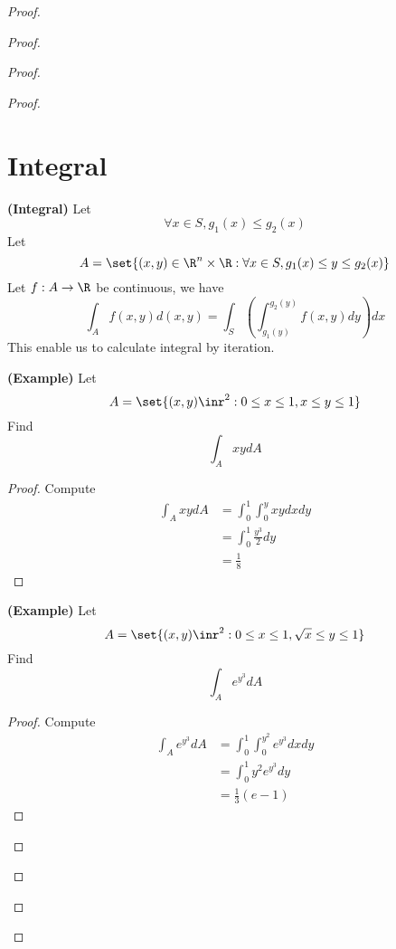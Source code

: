 \documentclass{report}
\begin{document}
\begin{proof}
\begin{proof}
\begin{proof}
\begin{proof}
\section{Integral}
\begin{theorem}
\label{8.6.1}
\textbf{(Integral)} Let 
 \begin{equation}
\forall x \in S, g_1(x)\leq g_2(x)
\end{equation}
Let  
\begin{equation}
A=\set{(x,y)\in \R^n \times \R: \forall x \in S, g_1(x)\leq y\leq g_2(x)}
\end{equation}
Let $f:A \rightarrow \R$ be continuous, we have
\begin{equation}
\int_A f(x,y)d(x,y)=\int_S(\int_{g_1(y)}^{g_2(y)} f(x,y)dy)dx
\end{equation}
This enable us to calculate integral by iteration.  
\end{theorem}
\begin{theorem}
\label{8.6.2}
\textbf{(Example)} Let 
\begin{equation}
A=\set{(x,y)\inr^2 : 0\leq x\leq 1, x\leq y\leq 1}
\end{equation}
Find
\begin{equation}
\int_A xydA
\end{equation}
\end{theorem}
\begin{proof}
Compute
\begin{align}
  \int_A xydA&=\int_0^1\int_0^y xy dxdy\\
  &=\int_0^1 \frac{y^3}{2}dy\\
  &=\frac{1}{8}
\end{align}
\end{proof}
\begin{theorem}
\label{8.6.3}
\textbf{(Example)} Let 
\begin{equation}
A=\set{(x,y)\inr^2 :0\leq x\leq 1, \sqrt{x} \leq y\leq 1}
\end{equation}
Find 
\begin{equation}
\int_A e^{y^3}dA
\end{equation}
\end{theorem}
\begin{proof}
Compute
\begin{align}
  \int_A e^{y^3}dA&=\int^1_0\int^{y^2}_0 e^{y^3}dxdy\\
&=\int_0^1 y^2e^{y^3}dy\\
&=\frac{1}{3}(e-1)
\end{align}
\end{proof}

\end{proof}
\end{proof}
\end{proof}
\end{proof}
\end{document}

